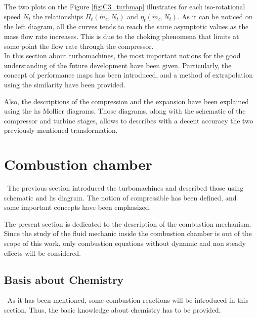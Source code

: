 The two plots on the Figure \ref{fig:C3_turbmap} illustrates for each iso-rotational speed $N_t$ the relationships $\Pi_t(\dot{m}_c,N_t)$ and $\eta_t(\dot{m}_c,N_t)$. As it can be noticed on the left diagram, all the curves tends to reach the same asymptotic values as the mass flow rate increases. This is due to the choking phenomena that limits at some point the flow rate through the compressor.\\

In this section about turbomachines, the most important notions for the good understanding of the future development have been given. Particularly, the concept of performance maps has been introduced, and a method of extrapolation using the similarity have been provided. 

Also, the descriptions of the compression and the expansion have been explained using the hs Mollier diagrams. Those diagrams, along with the schematic of the compressor and turbine stages, allows to describes with a decent accuracy the two previously mentioned transformation. 
\newpage
\section{Combustion chamber}
\quad\, The previous section introduced the turbomachines and described those using schematic and hs diagram. The notion of compressible has been defined, and some important concepts have been emphasized. 

The present section is dedicated to the description of the combustion mechanism. Since the study of the fluid mechanic inside the combustion chamber is out of the scope of this work, only combustion equations without dynamic and non steady effects will be considered.

\subsection{Basis about Chemistry}
\quad\, As it has been mentioned, some combustion reactions will be introduced in this section. Thus, the basic knowledge about chemistry has to be provided.\\

